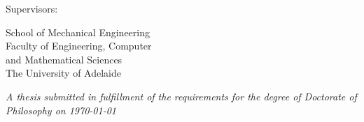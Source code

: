 
\begin{titlepage}

  \thispagestyle{empty}\noindent
  \vfill

  \begin{center}
  \huge{\thetitle}%
  \vfill\noindent
  \Large{\theauthor}
  \vfill

  \small{Supervisors:\\\supervisors}
  \end{center}

  \vfill

  \small{
  School of Mechanical Engineering\\
  Faculty of Engineering, Computer\\ and Mathematical Sciences\\
  The University of Adelaide
  }

  \vfill

  \center
\emph{A thesis submitted in fulfillment of the requirements for the degree of Doctorate of Philosophy on \mydate\today}

\end{titlepage}

